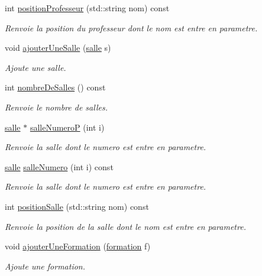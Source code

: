 \begin{DoxyCompactItemize}
int \hyperlink{classliste_ressources_a1d7b514a5f879849283a5326bd102d9c}{position\+Professeur} (std\+::string nom) const
\begin{DoxyCompactList}\small\item\em Renvoie la position du professeur dont le nom est entre en parametre. \end{DoxyCompactList}\item 
void \hyperlink{classliste_ressources_ae5c412bcd7a536081d98181e836d578b}{ajouter\+Une\+Salle} (\hyperlink{classsalle}{salle} s)
\begin{DoxyCompactList}\small\item\em Ajoute une salle. \end{DoxyCompactList}\item 
int \hyperlink{classliste_ressources_a1a7f82a289bda61cf08485e92dd32b2e}{nombre\+De\+Salles} () const
\begin{DoxyCompactList}\small\item\em Renvoie le nombre de salles. \end{DoxyCompactList}\item 
\hyperlink{classsalle}{salle} $\ast$ \hyperlink{classliste_ressources_a1badd55beb2e05645cc17d488fd0a3b9}{salle\+NumeroP} (int i)
\begin{DoxyCompactList}\small\item\em Renvoie la salle dont le numero est entre en parametre. \end{DoxyCompactList}\item 
\hyperlink{classsalle}{salle} \hyperlink{classliste_ressources_ae49f2ce49be854dda108840fd3d26112}{salle\+Numero} (int i) const
\begin{DoxyCompactList}\small\item\em Renvoie la salle dont le numero est entre en parametre. \end{DoxyCompactList}\item 
int \hyperlink{classliste_ressources_ad4f9c36ed425f2a3d4ca161abd6198da}{position\+Salle} (std\+::string nom) const
\begin{DoxyCompactList}\small\item\em Renvoie la position de la salle dont le nom est entre en parametre. \end{DoxyCompactList}\item 
void \hyperlink{classliste_ressources_a3b12d0a99dedc81a6a9ddfde375f3c3e}{ajouter\+Une\+Formation} (\hyperlink{classformation}{formation} f)
\begin{DoxyCompactList}\small\item\em Ajoute une formation. \end{DoxyCompactList}\item 

\end{DoxyCompactItemize}
